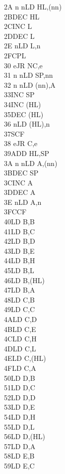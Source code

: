 \documentclass[12pt,twoside,openright,a4paper]{book}
\begin{document}
\begin{multicols}{3}
{\begin{tabbing}
	2A n n\>LD HL,(nn)\\
	2B\>DEC HL\\
	2C\>INC L\\
	2D\>DEC L\\
	2E n\>LD L,n\\
	2F\>CPL\\
	30 e\>JR NC,e\\
	31 n n\>LD SP,nn\\
	32 n n\>LD (nn),A\\
	33\>INC SP\\
	34\>INC (HL)\\
	35\>DEC (HL)\\
	36 n\>LD (HL),n\\
	37\>SCF\\
	38 e\>JR C,e\\
	39\>ADD HL,SP\\
	3A n n\>LD A,(nn)\\
	3B\>DEC SP\\
	3C\>INC A\\
	3D\>DEC A\\
	3E n\>LD A,n\\
	3F\>CCF\\
	40\>LD B,B\\
	41\>LD B,C\\
	42\>LD B,D\\
	43\>LD B,E\\
	44\>LD B,H\\
	45\>LD B,L\\
	46\>LD B,(HL)\\
	47\>LD B,A\\
	48\>LD C,B\\
	49\>LD C,C\\
	4A\>LD C,D\\
	4B\>LD C,E\\
	4C\>LD C,H\\
	4D\>LD C,L\\
	4E\>LD C,(HL)\\
	4F\>LD C,A\\
	50\>LD D,B\\
	51\>LD D,C\\
	52\>LD D,D\\
	53\>LD D,E\\
	54\>LD D,H\\
	55\>LD D,L\\
	56\>LD D,(HL)\\
	57\>LD D,A\\
	58\>LD E,B\\
	59\>LD E,C\\

\end{tabbing}}
\end{multicols}
\end{document}
